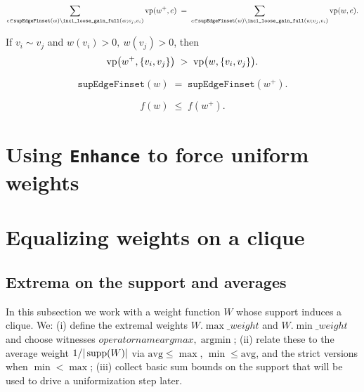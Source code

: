 \begin{lemma}\label{lem:enhance-sum-complement-unchanged}
\[
  \sum_{e\in \texttt{supEdgeFinset}(w)\setminus \texttt{inci\_loose\_gain\_full}(w;v_j,v_i)} \operatorname{vp}(w^+,e)
  \;=\;
  \sum_{e\in \texttt{supEdgeFinset}(w)\setminus \texttt{inci\_loose\_gain\_full}(w;v_j,v_i)} \operatorname{vp}(w,e).
\]
\leanok
\end{lemma}

\begin{lemma}\label{lem:enhance-edge-gainloose-increase}
If $v_i\sim v_j$ and $w(v_i)>0,\ w(v_j)>0$, then
\[
  \operatorname{vp}\bigl(w^+,\{v_i,v_j\}\bigr) \;>\; \operatorname{vp}\bigl(w,\{v_i,v_j\}\bigr).
\]
\leanok
\end{lemma}

\begin{lemma}\label{lem:enhance-support-edges-same}
\[
  \texttt{supEdgeFinset}(w) \;=\; \texttt{supEdgeFinset}(w^+).
\]
\leanok
\end{lemma}

\begin{lemma}\label{lem:enhance-total-weight-nondec}
\[
  f(w) \;\le\; f(w^+).
\]
\leanok
\end{lemma}

\section{Using \texttt{Enhance} to force uniform weights}

\section{Equalizing weights on a clique}\label{sec:equalizing}

\subsection{Extrema on the support and averages}
In this subsection we work with a weight function \(W\) whose support induces a clique.
We:
(i) define the extremal weights \(W.\max\_weight\) and \(W.\min\_weight\) and choose witnesses
\(operatorname{argmax}, \operatorname{argmin}\);
(ii) relate these to the average weight \(1/|\operatorname{supp}(W)|\) via
\(\text{avg}\le \max\), \(\min\le \text{avg}\), and the strict versions when \(\min<\max\);
(iii) collect basic sum bounds on the support that will be used to drive a uniformization step later.

